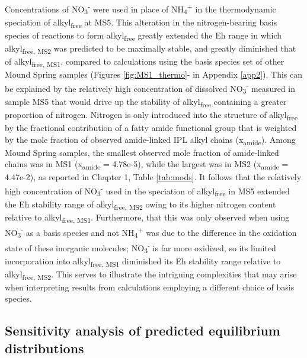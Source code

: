 Concentrations of NO\textsubscript{3}\textsuperscript{-} were used in place of NH\textsubscript{4}\textsuperscript{+} in the thermodynamic speciation of alkyl\textsubscript{free} at MS5. This alteration in the nitrogen-bearing basis species of reactions to form alkyl\textsubscript{free} greatly extended the Eh range in which alkyl\textsubscript{free, MS2} was predicted to be maximally stable, and greatly diminished that of alkyl\textsubscript{free, MS1}, compared to calculations using the basis species set of other Mound Spring samples (Figures \ref{fig:MS1_thermo}- in Appendix \ref{app2}). This can be explained by the relatively high concentration of dissolved NO\textsubscript{3}\textsuperscript{-} measured in sample MS5 that would drive up the stability of alkyl\textsubscript{free} containing a greater proportion of nitrogen. Nitrogen is only introduced into the structure of alkyl\textsubscript{free} by the fractional contribution of a fatty amide functional group that is weighted by the mole fraction of observed amide-linked IPL alkyl chains (x\textsubscript{amide}). Among Mound Spring samples, the smallest observed mole fraction of amide-linked chains was in MS1 (x\textsubscript{amide} = 4.78e-5), while the largest was in MS2 (x\textsubscript{amide} = 4.47e-2), as reported in Chapter 1, Table \ref{tab:mods}. It follows that the relatively high concentration of NO\textsubscript{3}\textsuperscript{-} used in the speciation of alkyl\textsubscript{free} in MS5 extended the Eh stability range of alkyl\textsubscript{free, MS2} owing to its higher nitrogen content relative to alkyl\textsubscript{free, MS1}. Furthermore, that this was only observed when using NO\textsubscript{3}\textsuperscript{-} as a basis species and not NH\textsubscript{4}\textsuperscript{+} was due to the difference in the oxidation state of these inorganic molecules; NO\textsubscript{3}\textsuperscript{-} is far more oxidized, so its limited incorporation into alkyl\textsubscript{free, MS1} diminished its Eh stability range relative to alkyl\textsubscript{free, MS2}. This serves to illustrate the intriguing complexities that may arise when interpreting results from calculations employing a different choice of basis species.


\subsection{Sensitivity analysis of predicted equilibrium distributions}

